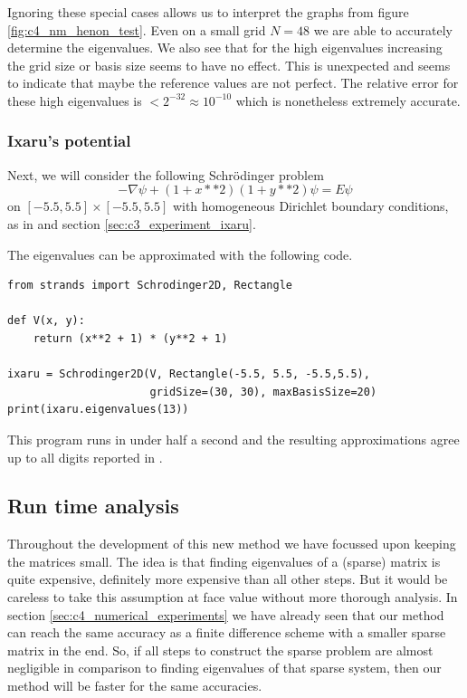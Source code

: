 Ignoring these special cases allows us to interpret the graphs from figure \ref{fig:c4_nm_henon_test}. Even on a small grid $N = 48$ we are able to accurately determine the eigenvalues. We also see that for the high eigenvalues increasing the grid size or basis size seems to have no effect. This is unexpected and seems to indicate that maybe the reference values are not perfect. The relative error for these high eigenvalues is $< 2^{-32} \approx 10^{-10}$ which is nonetheless extremely accurate.

\subsubsection{Ixaru's potential}\label{sec:c4_numerical_ixaru}

Next, we will consider the following Schrödinger problem
$$
-\nabla \psi + (1+x**2)(1+y**2) \psi = E\psi
$$
on $[-5.5, 5.5]\times [-5.5, 5.5]$ with homogeneous Dirichlet boundary conditions, as in \cite{ixaru_new_2010} and section \ref{sec:c3_experiment_ixaru}.

The eigenvalues can be approximated with the following code.

\begin{verbatim}
from strands import Schrodinger2D, Rectangle

def V(x, y):
    return (x**2 + 1) * (y**2 + 1)

ixaru = Schrodinger2D(V, Rectangle(-5.5, 5.5, -5.5,5.5),
                      gridSize=(30, 30), maxBasisSize=20)
print(ixaru.eigenvalues(13))
\end{verbatim}

This program runs in under half a second and the resulting approximations agree up to all digits reported in \cite{ixaru_new_2010}.


\subsection{Run time analysis}\label{sec:c4_nm_runtime}

Throughout the development of this new method we have focussed upon keeping the matrices small. The idea is that finding eigenvalues of a (sparse) matrix is quite expensive, definitely more expensive than all other steps. But it would be careless to take this assumption at face value without more thorough analysis. In section \ref{sec:c4_numerical_experiments} we have already seen that our method can reach the same accuracy as a finite difference scheme with a smaller sparse matrix in the end. So, if all steps to construct the sparse problem are almost negligible in comparison to finding eigenvalues of that sparse system, then our method will be faster for the same accuracies.


